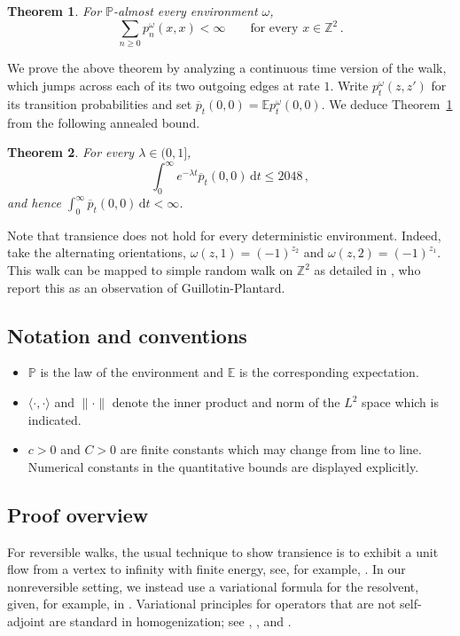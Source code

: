\documentclass[11pt]{amsart}
\theoremstyle{plain}
\newtheorem{theorem}{Theorem}[section]
\theoremstyle{definition}
\newcommand{\Z}{\mathbb Z}
\newcommand{\E}{\mathbb E}
\renewcommand{\P}{\mathbb P}
\newcommand{\1}{\mathbf 1}
\newcommand{\ip}[2]{\langle #1,#2\rangle}
\newcommand{\norm}[1]{\lVert #1\rVert}
\newcommand{\dd}{\,\mathrm d}
\begin{document}
	\begin{theorem}\label{thm:main}
		For $\P$-almost every environment $\omega$,
		\[
		\sum_{n\geq0}p^\omega_n(x,x)<\infty\qquad\text{for every }x\in\Z^2\, .
		\]
	\end{theorem}
	
	We prove the above theorem by analyzing a continuous time version of the
	walk, which jumps across each of its two outgoing edges at rate $1$. 
	Write $p^\omega_t(z,z')$ for its transition probabilities and set
	$\overline p_t(0,0)=\E p^\omega_t(0,0)$.  We deduce Theorem~\ref{thm:main}
	from the following annealed bound.
	
	\begin{theorem}\label{thm:annealed}
		For every $\lambda\in(0,1]$,
		\[
		\int_0^\infty e^{-\lambda t}\overline p_t(0,0)\dd t\leq2048\, ,
		\]
		and hence $\int_0^\infty\overline p_t(0,0)\dd t<\infty$.
	\end{theorem}
	
	Note that transience does not hold for every deterministic environment.
	Indeed, take the alternating orientations, $\omega(z,1)=(-1)^{z_2}$ and
	$\omega(z,2)=(-1)^{z_1}$.  This walk can be mapped to simple random walk on
	$\Z^2$ as detailed in \citet*{BH23}, who report
	this as an observation of Guillotin-Plantard.
	
	\subsection{Notation and conventions}\label{ssec:notation}
	
	\begin{itemize}
		\item $\P$ is the law of the environment and $\E$ is the corresponding
		expectation.
		\item $\ip\cdot\cdot$ and $\norm\cdot$ denote the inner product and norm of the
		$L^2$ space which is indicated. 
		\item $c>0$ and $C>0$ are finite constants which may change from line to
		line.  Numerical constants in the quantitative bounds are displayed
		explicitly.
	\end{itemize}
	
	\subsection{Proof overview}\label{ssec:proof-overview}
	
	For reversible walks, the usual technique to show transience is to exhibit a
	unit flow from a vertex to infinity with finite energy, see, for example,
	\citep*[Theorem~2.11]{LP16}.  In our nonreversible setting, we instead use a
	variational formula for the resolvent, given, for example, in
	\citep*[Theorem~4.1]{KLO12}.  Variational principles for operators that are
	not self-adjoint are standard in homogenization; see
	\citet*[Chapter~10]{AKM19}, \citet*[(2.4)]{ABK24}, and
	\citet*[(2.32)]{ABK26}.  	
	
\end{document}
